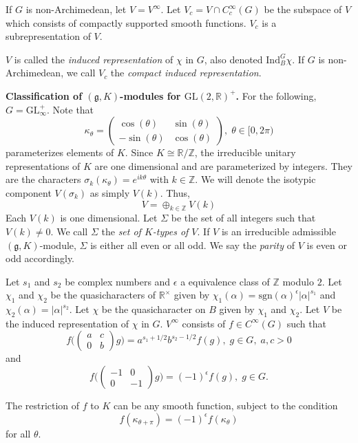 \documentclass[12pt, letterpaper, twoside]
{article}
\newcommand{\Z}{{\mathbb Z}} %
\newcommand{\R}{{\mathbb R}} %
\newcommand{\Ind}{\text{Ind}} %
\newcommand{\GL}{{\text{GL}}} %
\newcommand{\gI}{\mathfrak{g}} %
\begin{document}
If $G$ is non-Archimedean, let $V = V^\infty$. Let $V_c = V \cap C_c^\infty(G)$
be the subspace of $V$ which consists of compactly supported smooth functions.
$V_c$ is a subrepresentation of $V$.

$V$ is called the \textit{induced representation} of $\chi$ in $G$, also denoted
$\Ind_B^G \chi$. If $G$ is non-Archimedean, we call $V_c$ the \textit{compact
induced representation}.

\textbf{Classification of $(\gI, K)$-modules for $\GL(2, \R)^+$.} For the
following, $G = \GL_\infty^+$. Note that
\[\kappa_\theta = \begin{pmatrix} \cos(\theta) & \sin(\theta) \\ -\sin(\theta) &
\cos(\theta) \end{pmatrix}, \; \theta \in [0, 2\pi)\] parameterizes elements of
$K$. Since $K \cong \R/\Z$, the irreducible unitary representations of $K$ are
one dimensional and are parameterized by integers. They are the characters
$\sigma_k(\kappa_\theta) = e^{ik\theta}$ with $k \in \Z$. We will denote the
isotypic component $V(\sigma_k)$ as simply $V(k)$. Thus,
\[V = \oplus_{k \in \Z} V(k)\] Each $V(k)$ is one dimensional. Let $\Sigma$ be
the set of all integers such that $V(k) \neq 0$. We call $\Sigma$ the
\textit{set of $K$-types of $V$}. If $V$ is an irreducible admissible $(\gI,
K)$-module, $\Sigma$ is either all even or all odd. We say the \textit{parity}
of $V$ is even or odd accordingly.

Let $s_1$ and $s_2$ be complex numbers and $\epsilon$ a equivalence class of
$\Z$ modulo $2$. Let $\chi_1$ and $\chi_2$ be the quasicharacters of $\R^\times$
given by $\chi_1(\alpha) = \text{sgn}(\alpha)^\epsilon|\alpha|^{s_1}$ and
$\chi_2(\alpha) = |\alpha|^{s_2}$. Let $\chi$ be the quasicharacter on $B$ given
by $\chi_1$ and $\chi_2$. Let $V$ be the induced representation of $\chi$ in
$G$. $V^\infty$ consists of $f \in C^\infty(G)$ such that
\[f \bigg( \begin{pmatrix} a & c \\ 0 & b \end{pmatrix} g\bigg) = a^{s_1 +
1/2}b^{s_2 - 1/2}f(g), \; g \in G, \; a, c > 0\] and
\[f \bigg( \begin{pmatrix} -1 & 0 \\ 0 & -1 \end{pmatrix} g\bigg) =
(-1)^\epsilon f(g), \; g \in G.\]

The restriction of $f$ to $K$ can be any smooth function, subject to the
condition
\[f(\kappa_{\theta + \pi}) = (-1)^\epsilon f(\kappa_\theta)\] for all $\theta$.
\end{document}
